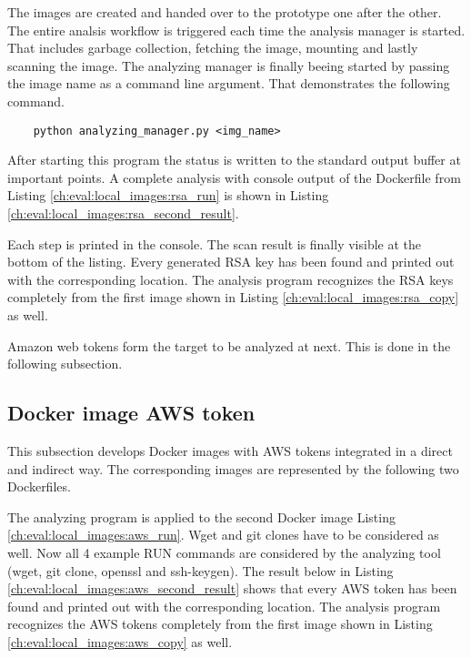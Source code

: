 The images are created and handed over to the prototype one after the other.
The entire analsis workflow is triggered each time the analysis manager is started. 
That includes garbage collection, fetching the image, mounting and lastly scanning the image.
The analyzing manager is finally beeing started by passing the image name as a command line argument. 
That demonstrates the following command.
\begin{lstlisting}
	python analyzing_manager.py <img_name>
\end{lstlisting}
After starting this program the status is written to the standard output buffer at important points.
A complete analysis with console output of the Dockerfile from Listing \ref{ch:eval:local_images:rsa_run} is shown in Listing \ref{ch:eval:local_images:rsa_second_result}.

Each step is printed in the console. The scan result is finally visible at the bottom of the listing. 
Every generated RSA key has been found and printed out with the corresponding location.
The analysis program recognizes the RSA keys completely from the first image shown in Listing \ref{ch:eval:local_images:rsa_copy} as well. 

Amazon web tokens form the target to be analyzed at next. This is done in the following subsection. 

\subsection{Docker image AWS token}
\label{ch:eval:local_images:aws}
This subsection develops Docker images with AWS tokens integrated in a direct and indirect way. 
The corresponding images are represented by the following two Dockerfiles.


The analyzing program is applied to the second Docker image Listing \ref{ch:eval:local_images:aws_run}. 
Wget and git clones have to be considered as well. 
Now all 4 example RUN commands are considered by the analyzing tool (wget, git clone, openssl and ssh-keygen). 
The result below in Listing \ref{ch:eval:local_images:aws_second_result} shows that every AWS token has been found and printed out with the corresponding location.
The analysis program recognizes the AWS tokens completely from the first image shown in Listing \ref{ch:eval:local_images:aws_copy} as well.


